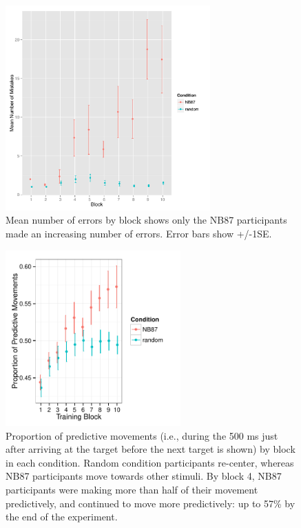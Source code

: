 \documentclass[man,floatsintext]{apa6}
\begin{document}
\begin{figure}[!h]
  \centering
  \includegraphics[width=0.7\textwidth]{figures/exp1_training_mistakes_per_block}
  \caption{Mean number of errors by block shows only the NB87 participants made an increasing number of errors. Error bars show +/-1SE.}
  \label{fig:fail-block}
\end{figure} 


\begin{figure}[!h]
  \centering
  \includegraphics[width=0.6\textwidth]{figures/exp1_predictive_moves_vs_block}
  \caption{\small{Proportion of predictive movements (i.e., during the 500 ms just after arriving at the target before the next target is shown) by block in each condition. Random condition participants re-center, whereas NB87 participants move towards other stimuli. By block 4, NB87 participants were making more than half of their movement predictively, and continued to move more predictively: up to 57\% by the end of the experiment.}}
  \label{fig:predict}
\end{figure} 
\end{document}
